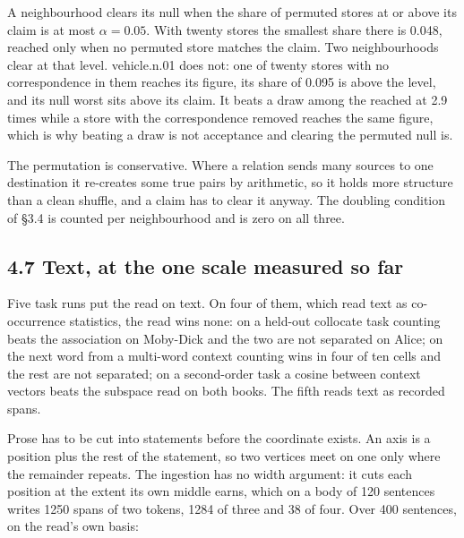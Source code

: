 \documentclass[10pt,letterpaper,twocolumn]{article}
\begin{document}
A neighbourhood clears its null when the share of permuted stores at or above its claim is at most
\(\alpha = 0.05\). With twenty stores the smallest share there is 0.048, reached only when no permuted
store matches the claim. Two neighbourhoods clear at that level. vehicle.n.01 does not: one of twenty
stores with no correspondence in them reaches its figure, its share of 0.095 is above the level, and
its null worst sits above its claim. It beats a draw among the reached at 2.9 times while a store with
the correspondence removed reaches the same figure, which is why beating a draw is not acceptance and
clearing the permuted null is.

The permutation is conservative. Where a relation sends many sources to one destination it
re-creates some true pairs by arithmetic, so it holds more structure than a clean shuffle, and a claim
has to clear it anyway. The doubling condition of §3.4 is counted per neighbourhood and is zero on all
three.

\subsection{4.7 Text, at the one scale measured so far}\label{47-text-at-the-one-scale-measured-so-far}

Five task runs put the read on text. On four of them, which read text as co-occurrence statistics,
the read wins none: on a held-out collocate task counting beats the association on Moby-Dick and
the two are not separated on Alice; on the next word from a multi-word context counting wins in four
of ten cells and the rest are not separated; on a second-order task a cosine between context vectors beats
the subspace read on both books. The fifth reads text as recorded spans.

Prose has to be cut into statements before the coordinate exists. An axis is a position plus the
rest of the statement, so two vertices meet on one only where the remainder repeats. The ingestion
has no width argument: it cuts each position at the extent its own middle earns, which on a body of
120 sentences writes 1250 spans of two tokens, 1284 of three and 38 of four. Over 400 sentences, on
the read's own basis:

\end{document}
